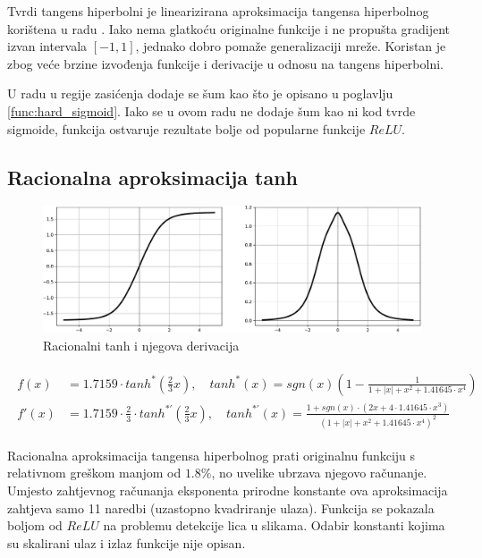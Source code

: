 \documentclass[times, utf8, numeric, diplomski]{fer}
\begin{document}
Tvrdi tangens hiperbolni je linearizirana aproksimacija tangensa hiperbolnog korištena u radu \citet{collobert_phd}. Iako nema glatkoću originalne funkcije i ne propušta gradijent izvan intervala $[-1,1]$, jednako dobro pomaže generalizaciji mreže. Koristan je zbog veće brzine izvođenja funkcije i derivacije u odnosu na tangens hiperbolni.

U radu \citet{hardsigm} u regije zasićenja dodaje se šum kao što je opisano u poglavlju \ref{func:hard_sigmoid}. Iako se u ovom radu ne dodaje šum kao ni kod tvrde sigmoide, funkcija ostvaruje rezultate bolje od popularne funkcije $ReLU$.

\subsection{Racionalna aproksimacija tanh}

\begin{figure}[H]
\includegraphics[width=\textwidth]{func_Rational_tanh.pdf}
\centering
\caption{Racionalni tanh i njegova derivacija}
\label{fig:rational_tanh}
\end{figure}

\begin{align}
\label{eq:rattanh}
\begin{split}
f(x) &= 1.7159 \cdot tanh^*(\frac{2}{3}x), \quad
tanh^*(x) = sgn(x)(1 - \frac{1}{1 + |x| + x^2 + 1.41645 \cdot x^4}) \\
f'(x) &= 1.7159 \cdot \frac{2}{3} \cdot tanh^{*'}(\frac{2}{3}x), \quad
tanh^{*'}(x) = \frac{1+sgn(x) \cdot (2x + 4 \cdot 1.41645 \cdot x^3)}{(1 + |x| + x^2 + 1.41645 \cdot x^4)^2}
\end{split}
\end{align}

Racionalna aproksimacija tangensa hiperbolnog prati originalnu funkciju s relativnom greškom manjom od $1.8\%$, no uvelike ubrzava njegovo računanje. Umjesto zahtjevnog računanja eksponenta prirodne konstante ova aproksimacija zahtjeva samo 11 naredbi (uzastopno kvadriranje ulaza). Funkcija se pokazala boljom od $ReLU$ na problemu detekcije lica u slikama. Odabir konstanti kojima su skalirani ulaz i izlaz funkcije nije opisan. \citep{rattanh}
\end{document}
